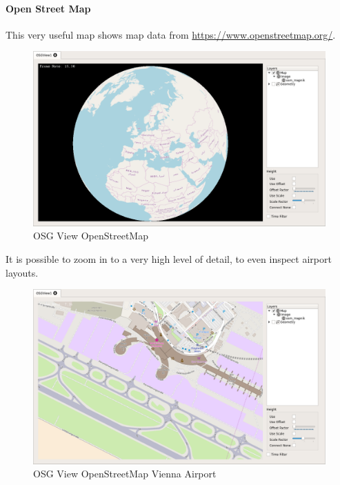 \documentclass[10pt,letterpaper,extrafontsizes]{memoir}
\begin{document}
{\newpage
\paragraph{Open Street Map}

This very useful map shows map data from \url{https://www.openstreetmap.org/}.

\begin{figure}[H]
    \hspace*{-2cm}
    \includegraphics[width=18cm]{../screenshots/osgview_osm.png}
  \caption{OSG View OpenStreetMap}
\end{figure}

It is possible to zoom in to a very high level of detail, to even inspect airport layouts.

\begin{figure}[H]
    \hspace*{-2cm}
    \includegraphics[width=18cm]{../screenshots/osgview_osm_vienna.png}
  \caption{OSG View OpenStreetMap Vienna Airport}
\end{figure}

}
\end{document}
